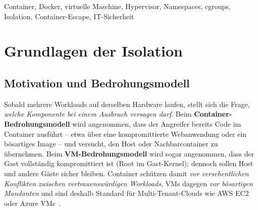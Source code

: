 \documentclass[conference]{IEEEtran}
\begin{document}
\begin{IEEEkeywords}
Container, Docker, virtuelle Maschine, Hypervisor, Namespaces, cgroups,
Isolation, Container-Escape, IT-Sicherheit
\end{IEEEkeywords}

\section{Grundlagen der Isolation}
\label{Grundlagen der Isolation}

\subsection{Motivation und Bedrohungsmodell}
Sobald mehrere Workloads auf derselben Hardware laufen, stellt sich die Frage,
\textit{welche Komponente bei einem Ausbruch versagen darf}. Beim
\textbf{Container-Bedrohungsmodell} wird angenommen, dass der Angreifer bereits
Code im Container ausführt -- etwa über eine kompromittierte Webanwendung
oder ein bösartiges Image -- und versucht, den Host oder Nachbarcontainer zu
übernehmen. Beim \textbf{VM-Bedrohungsmodell} wird sogar angenommen, dass der
Gast vollständig kompromittiert ist (Root im Gast-Kernel); dennoch sollen Host
und andere Gäste sicher bleiben. Container schützen damit \textit{vor versehentlichen
Konflikten zwischen vertrauenswürdigen Workloads}, VMs dagegen
\textit{vor bösartigen Mandanten} und sind deshalb Standard für Multi-Tenant-Clouds
wie AWS EC2 oder Azure VMs~\cite{b_nist_container,b_vm_container_compare}.
\end{document}
